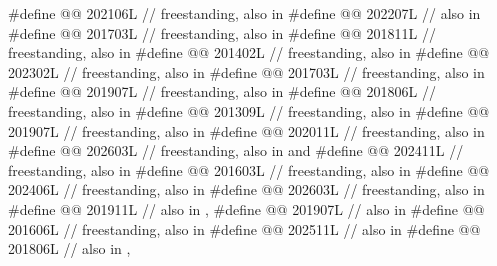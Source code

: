 \begin{codeblock}
#define @@                          202106L // freestanding, also in 
#define @@                     202207L // also in 
#define @@                      201703L // freestanding, also in 
#define @@             201811L // freestanding, also in 
#define @@                          201402L // freestanding, also in 
#define @@              202302L // freestanding, also in 
#define @@                      201703L // freestanding, also in 
#define @@              201907L // freestanding, also in 
#define @@            201806L // freestanding, also in 
#define @@                   201309L // freestanding, also in 
#define @@       201907L // freestanding, also in 
#define @@                    202011L // freestanding, also in 
#define @@                     202603L
  // freestanding, also in  and 
#define @@           202411L // freestanding, also in 
#define @@                      201603L // freestanding, also in 
#define @@                202406L // freestanding, also in 
#define @@                202603L // freestanding, also in 
#define @@                           201911L // also in , 
#define @@                             201907L // also in 
#define @@                           201606L // freestanding, also in 
#define @@                            202511L // also in 
#define @@           201806L // also in , 

\end{codeblock}
